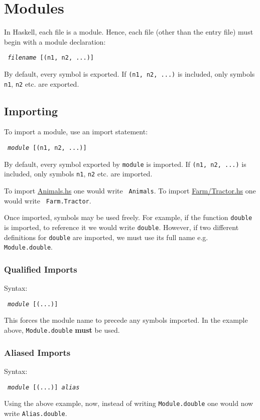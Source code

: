 \section{Modules}

In Haskell, each file is a module. Hence, each file (other than the entry file) must begin with a module declaration:

\begin{center}
  \texttt{ \textit{filename} [(n1, n2, ...)] }
\end{center}

By default, every symbol is exported. If \texttt{(n1, n2, ...)} is included, only symbols \texttt{n1}, \texttt{n2} etc. are exported.

\subsection{Importing}

To import a module, use an import statement:

\begin{center}
  \texttt{ \textit{module} [(n1, n2, ...)]}
\end{center}

By default, every symbol exported by \texttt{module} is imported. If \texttt{(n1, n2, ...)} is included, only symbols \texttt{n1}, \texttt{n2} etc. are imported.

To import \url{Animals.hs} one would write \texttt{ Animals}.
To import \url{Farm/Tractor.hs} one would write \texttt{ Farm.Tractor}.

Once imported, symbols may be used freely. For example, if the function \texttt{double} is imported, to reference it we would write \texttt{double}. However, if two different definitions for \texttt{double} are imported, we must use its full name e.g. \texttt{Module.double}.

\subsubsection{Qualified Imports}

Syntax:

\begin{center}
  \texttt{ \textit{module} [(...)]}
\end{center}

This forces the module name to precede any symbols imported. In the example above, \texttt{Module.double} \textbf{must} be used.

\subsubsection{Aliased Imports}

Syntax:

\begin{center}
  \texttt{ \textit{module} [(...)]  \textit{alias}}
\end{center}

Using the above example, now, instead of writing \texttt{Module.double} one would now write \texttt{Alias.double}.